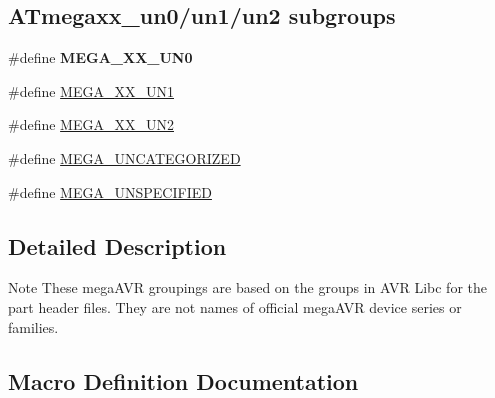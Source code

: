 \subsection*{A\+Tmegaxx\+\_\+un0/un1/un2 subgroups}
\begin{DoxyCompactItemize}
\item 
\#define {\bfseries M\+E\+G\+A\+\_\+\+X\+X\+\_\+\+U\+N0}
\item 
\#define \hyperlink{group__mega__part__macros__group_gaad35e34280ef078dec0cc18c3ea6d3f6}{M\+E\+G\+A\+\_\+\+X\+X\+\_\+\+U\+N1}
\item 
\#define \hyperlink{group__mega__part__macros__group_ga5f4566d4ddaa3cee92d4c78162594f2d}{M\+E\+G\+A\+\_\+\+X\+X\+\_\+\+U\+N2}
\item 
\#define \hyperlink{group__mega__part__macros__group_ga9252d02a9216d5e9bf94000667ad6cb1}{M\+E\+G\+A\+\_\+\+U\+N\+C\+A\+T\+E\+G\+O\+R\+I\+Z\+E\+D}
\item 
\#define \hyperlink{group__mega__part__macros__group_gaabb3078f36ad4d875915bd54fa46f337}{M\+E\+G\+A\+\_\+\+U\+N\+S\+P\+E\+C\+I\+F\+I\+E\+D}
\end{DoxyCompactItemize}


\subsection{Detailed Description}
\begin{DoxyNote}{Note}
These mega\+A\+V\+R groupings are based on the groups in A\+V\+R Libc for the part header files. They are not names of official mega\+A\+V\+R device series or families. 
\end{DoxyNote}


\subsection{Macro Definition Documentation}
\hypertarget{group__mega__part__macros__group_ga78a6115b485de47c7cc56b224c558ea2}{}
